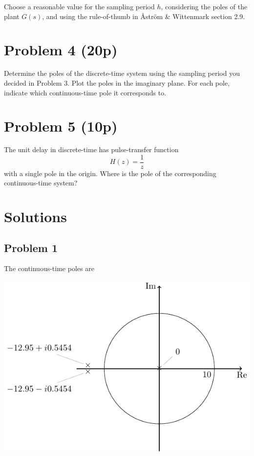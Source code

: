 \documentclass{scrartcl}
\begin{document}
  Choose a reasonable value for the sampling period $h$, considering the poles of the plant $G(s)$, and using the rule-of-thumb in Åström \& Wittenmark section 2.9.
\section*{Problem 4 (20p)}
\label{sec-6}

  Determine the poles of the discrete-time system using the sampling period you decided in Problem 3. Plot the poles in the imaginary plane. For each pole, indicate which continuous-time pole it corresponds to.
\section*{Problem 5 (10p)}
\label{sec-7}

  The unit delay in discrete-time has pulse-transfer function \[H(z) =\frac{1}{z}\] with a single pole in the origin. Where is the pole of the corresponding continuous-time system? 
\section*{Solutions}
\label{sec-8}
\subsection*{Problem 1}
\label{sec-8-1}

   The continuous-time poles are
   \begin{center}
   \includegraphics[]{ct-poles}
   \end{center}
   
\end{document}
